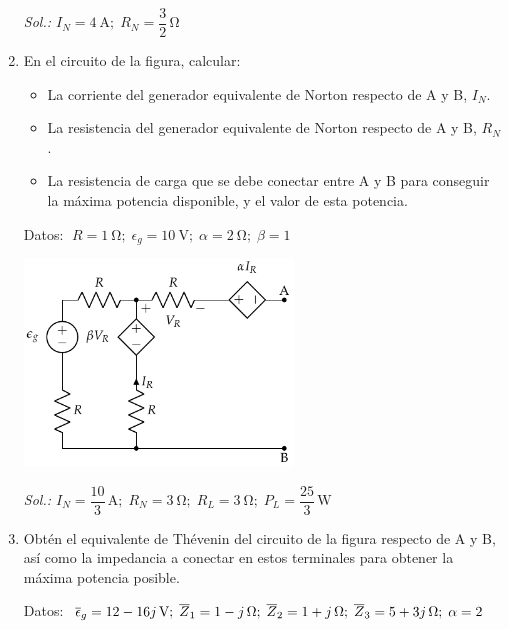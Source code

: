\begin{enumerate}
    \emph{Sol.:\; 
      $I_N = \qty{4}{\ampere};\; R_N = \dfrac{3}{2}\,\si{\ohm}$}
      

  \item En el circuito de la figura, calcular:
    \begin{itemize}
    \item La corriente del generador equivalente de Norton respecto de
      A y B, $I_N$.
    \item La resistencia del generador equivalente de Norton respecto
      de A y B, $R_N$.
    \item La resistencia de carga que se debe conectar entre A y B
      para conseguir la máxima potencia disponible, y el valor de esta
      potencia.
    \end{itemize}
    Datos:
    $\; R = \qty{1}{\ohm};\; \epsilon_g = \qty{10}{\volt};\; \alpha = \qty{2}{\ohm};\; \beta = 1$

    \begin{center}
      \includegraphics[height=5.5cm]{../figs/norton.pdf}
    \end{center}

\emph{Sol.:\;
  $I_N=\dfrac{10}{3}\,\si{\ampere};\; R_N=\qty{3}{\ohm};\; R_L=\qty{3}{\ohm};\;
  P_L=\dfrac{25}{3}\,\si{\watt}$}

\item   Obtén el equivalente de Thévenin del circuito de la figura
  respecto de A y B, así como la impedancia a conectar en estos terminales para obtener la máxima potencia posible.

Datos: $\; \overline{\epsilon}_g = \qty[parse-numbers=false]{12 - 16j}{\volt};\;
  \overline{Z}_1 = \qty[parse-numbers=false]{1 - j}{\ohm};\;
  \overline{Z}_2 = \qty[parse-numbers=false]{1 + j}{\ohm};\;
  \overline{Z}_3 = \qty[parse-numbers=false]{5 + 3j}{\ohm};\;
  \alpha = 2 $
  

\end{enumerate}
